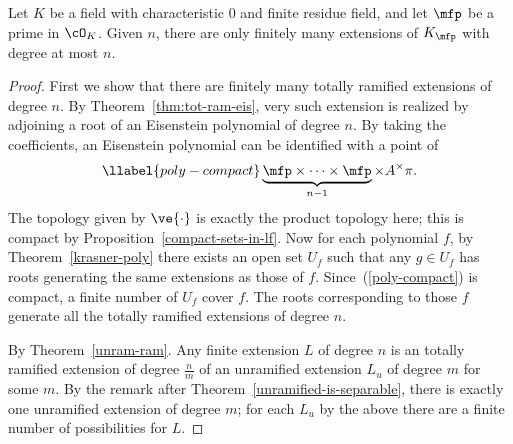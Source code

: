 \begin{thm}
Let $K$ be a field with characteristic 0 and finite residue field, and let $\mfp$ be a prime in $\cO_K$. 
Given $n$, there are only finitely many %
extensions of $K_{\mfp}$ with degree at most $n$.
\end{thm}
\begin{proof}
First we show that there are finitely many totally ramified extensions of degree $n$. By Theorem~\ref{thm:tot-ram-eis}, very such extension is realized by adjoining a root of an Eisenstein polynomial of degree $n$. By taking the coefficients, an Eisenstein polynomial can be identified with a point of 
\begin{equation}\llabel{poly-compact}
\underbrace{\mfp\times \cdots \times \mfp}_{n-1}\times A^{\times}\pi.
\end{equation}
The topology given by $\ve{\cdot}$ is exactly the product topology here; this is compact by Proposition~\ref{compact-sets-in-lf}. Now for each polynomial $f$, by Theorem~\ref{krasner-poly} there exists an open set $U_f$ such that any $g\in U_f$ has roots generating the same extensions as those of $f$. Since~(\ref{poly-compact}) is compact, a finite number of $U_f$ cover $f$. The roots corresponding to those $f$ generate all the totally ramified extensions of degree $n$.

By Theorem~\ref{unram-ram}. Any finite extension $L$ of degree $n$ is an totally ramified extension of degree $\frac{n}{m}$ of an unramified extension $L_u$ of degree $m$ for some $m$. By the remark after Theorem~\ref{unramified-is-separable}, %
there is exactly one unramified extension of degree $m$; for each $L_u$ by the above there are a finite number of possibilities for $L$.
\end{proof}
